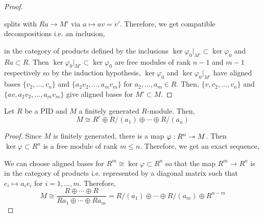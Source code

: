 \documentclass[12pt]{article}
\begin{document}
\begin{proof}
\begin{center}
\begin{tikzcd}
\end{tikzcd}
\end{center}
splits with $R a \to M'$ via $a \mapsto av = v'$. Therefore, we get compatible decompositions i.e. an inclusion,
\begin{center}
\end{center} 
in the category of products defined by the inclusions $\ker{\varphi_0|_{M'}} \subset \ker{\varphi_0}$ and $R a \subset R$.
Then $\ker{\varphi_0|_{M'}} \subset \ker{\varphi_0}$ are free modules of rank $n-1$ and $m-1$ respectively so by the induction hypothesis, $\ker{\varphi_0}$ and $\ker{\varphi_0|_{M'}}$ have aligned bases $\{ v_2, \dots, v_{n} \}$ and $\{ a_2 v_2, \dots, a_m v_m \}$ for $a_2, \dots, a_m \in R$. Then, $\{ v, v_2, \dots, v_n \}$ and $\{ a v, a_2 v_2, \dots, a_m v_m \}$ give aligned bases for $M' \subset M$.
\end{proof}

\begin{theorem}
Let $R$ be a PID and $M$ a finitely generated $R$-module. Then,
\[ M \cong R^r \oplus R/(a_1) \oplus \cdots \oplus R/(a_n) \]
\end{theorem}

\begin{proof}
Since $M$ is finitely generated, there is a map $\varphi : R^n \onto M$. Then $\ker{\varphi} \subset R^n$ is a free module of rank $m \le n$. Therefore, we get an exact sequence,
\begin{center}
\end{center}
We can choose aligned bases for $R^m \cong \ker{\varphi} \subset R^n$ so that the map $R^m \to R^n$ is in the category of products i.e. represented by a diagonal matrix such that $e_i \mapsto a_i e_i$ for $i = 1, \dots, m$. Therefore,
\[ M \cong \frac{R \oplus \cdots \oplus R}{R a_1 \oplus \cdots \oplus R a_m} = R/(a_1) \oplus \cdots \oplus R / (a_m) \oplus R^{n - m} \]
\end{proof}
\end{document}
